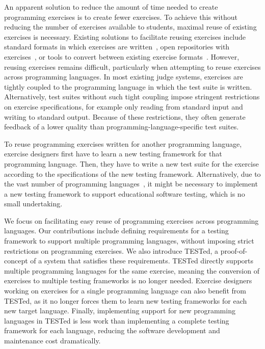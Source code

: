 \documentclass[../main]{subfiles}
\begin{document}
An apparent solution to reduce the amount of time needed to create programming exercises is to create fewer exercises.
To achieve this without reducing the number of exercises available to students, maximal reuse of existing exercises is necessary.
Existing solutions to facilitate reusing exercises include standard formats in which exercises are written~\autocite{paivaAnotherProgrammingExercises2020,verhoeffProgrammingTaskPackages2008}, open repositories with exercises~\autocite{staubitzRepositoryOpenAutogradable2017}, or tools to convert between existing exercise formats~\autocite{queirosBabeLOExtensibleConverter2013}.
However, reusing exercises remains difficult, particularly when attempting to reuse exercises across programming languages.
In most existing judge systems, exercises are tightly coupled to the programming language in which the test suite is written.
Alternatively, test suites without such tight coupling impose stringent restrictions on exercise specifications, for example only reading from standard input and writing to standard output.
Because of these restrictions, they often generate feedback of a lower quality than programming-language-specific test suites.

To reuse programming exercises written for another programming language, exercise designers first have to learn a new testing framework for that programming language.
Then, they have to write a new test suite for the exercise according to the specifications of the new testing framework.
Alternatively, due to the vast number of programming languages~\autocite{bissyandePopularityInteroperabilityImpact2013}, it might be necessary to implement a new testing framework to support educational software testing, which is no small undertaking.

We focus on facilitating easy reuse of programming exercises across programming languages.
Our contributions include defining requirements for a testing framework to support multiple programming languages, without imposing strict restrictions on programming exercises.
We also introduce TESTed, a proof-of-concept of a system that satisfies these requirements.
TESTed directly supports multiple programming languages for the same exercise, meaning the conversion of exercises to multiple testing frameworks is no longer needed.
Exercise designers working on exercises for a single programming language can also benefit from TESTed, as it no longer forces them to learn new testing frameworks for each new target language.
Finally, implementing support for new programming languages in TESTed is less work than implementing a complete testing framework for each language, reducing the software development and maintenance cost dramatically.
\end{document}
